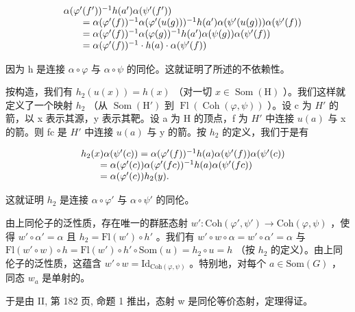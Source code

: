 \[
\begin{array}{r l} & {\alpha (\varphi^ {\prime} (f ^ {\prime})) ^ {- 1} h (a ^ {\prime}) \alpha (\psi^ {\prime} (f ^ {\prime}))} \\ & {\qquad = \alpha (\varphi^ {\prime} (f)) ^ {- 1} \alpha (\varphi^ {\prime} (u (g))) ^ {- 1} h (a ^ {\prime}) \alpha (\psi^ {\prime} (u (g))) \alpha (\psi^ {\prime} (f))} \\ & {\qquad = \alpha (\varphi^ {\prime} (f)) ^ {- 1} \alpha (\varphi (g)) ^ {- 1} h (a ^ {\prime}) \alpha (\psi (g)) \alpha (\psi^ {\prime} (f))} \\ & {\qquad = \alpha (\varphi^ {\prime} (f)) ^ {- 1} \cdot h (a) \cdot \alpha (\psi^ {\prime} (f))} \end{array}
\]

因为 h 是连接 \(\alpha \circ \varphi\) 与 \(\alpha \circ \psi\) 的同伦。这就证明了所述的不依赖性。

按构造，我们有 \(h_{2}(u(x)) = h(x)\) （对一切 \(x \in \operatorname{Som}(\mathrm{H})\) ）。我们这样就定义了一个映射 \(h_{2}\) （从 \(\operatorname{Som}(\mathrm{H}')\) 到 \(\operatorname{Fl}(\operatorname{Coh}(\varphi, \psi))\) ）。设 c 为 \(H'\) 的箭，以 x 表示其源，y 表示其靶。设 a 为 H 的顶点，f 为 \(H'\) 中连接 \(u(a)\) 与 x 的箭。则 fc 是 \(H'\) 中连接 \(u(a)\) 与 y 的箭。按 \(h_{2}\) 的定义，我们于是有

\[
\begin{array}{r l} & h _ {2} (x) \alpha (\psi^ {\prime} (c)) = \alpha (\varphi^ {\prime} (f)) ^ {- 1} h (a) \alpha (\psi^ {\prime} (f)) \alpha (\psi^ {\prime} (c)) \\ & \qquad = \alpha (\varphi^ {\prime} (c)) \alpha (\varphi^ {\prime} (f c)) ^ {- 1} h (a) \alpha (\psi^ {\prime} (f c)) \\ & \qquad = \alpha (\varphi^ {\prime} (c)) h _ {2} (y). \end{array}
\]

这就证明 \(h_{2}\) 是连接 \(\alpha \circ \varphi'\) 与 \(\alpha \circ \psi'\) 的同伦。

由上同伦子的泛性质，存在唯一的群胚态射 \(w'\colon \mathrm{Coh}(\varphi', \psi') \to \mathrm{Coh}(\varphi, \psi)\) ，使得 \(w' \circ \alpha' = \alpha\) 且 \(h_2 = \mathrm{Fl}(w') \circ h'\) 。我们有 \(w' \circ w \circ \alpha = w' \circ \alpha' = \alpha\) 与 \(\mathrm{Fl}(w' \circ w) \circ h = \mathrm{Fl}(w') \circ h' \circ \mathrm{Som}(u) = h_2 \circ u = h\) （按 \(h_2\) 的定义）。由上同伦子的泛性质，这蕴含 \(w' \circ w = \mathrm{Id}_{\mathrm{Coh}(\varphi, \psi)}\) 。特别地，对每个 \(a \in \mathrm{Som}(G)\) ，同态 \(w_a\) 是单射的。

于是由 II, 第 182 页, 命题 1 推出，态射 w 是同伦等价态射，定理得证。
\relax{}
